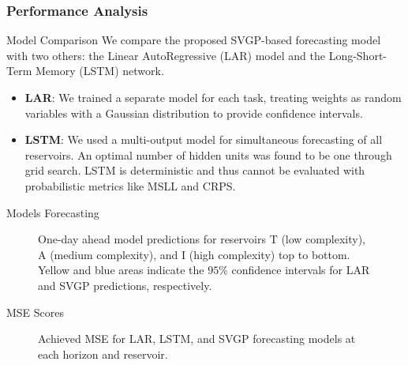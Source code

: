 \subsubsection{Performance Analysis}

\begin{frame}{Model Comparison}
	We compare the proposed SVGP-based forecasting model with two others: the Linear AutoRegressive (LAR) model and the Long-Short-Term Memory (LSTM) network.
	
	\begin{itemize}
		\item \textbf{LAR}: We trained a separate model for each task, treating weights as random variables with a Gaussian distribution to provide confidence intervals.
		\item \textbf{LSTM}: We used a multi-output model for simultaneous forecasting of all reservoirs. An optimal number of hidden units was found to be one through grid search. LSTM is deterministic and thus cannot be evaluated with probabilistic metrics like MSLL and CRPS.
	\end{itemize}
\end{frame}


\begin{frame}{Models Forecasting}
	\begin{figure}[htbp]
		\centering
		\setlength\figurewidth{\columnwidth} 
		\setlength{}
		
		\hfill
		\hfill
		
		
		\caption{One-day ahead model predictions for reservoirs T (low complexity), A (medium complexity), and I (high complexity) top to bottom. Yellow and blue areas indicate the $95\%$ confidence intervals for LAR and SVGP predictions, respectively.}
		
	\end{figure}
\end{frame}


\begin{frame}{MSE Scores}
	\begin{figure}[htbp]
		\setlength{} 
		\setlength{}
		\hspace{-1.5em}
		\hspace{-1.5em}
		\caption{Achieved MSE for LAR, LSTM, and SVGP forecasting models at each horizon and reservoir.}
		\label{fig:mse_scores} 
	\end{figure}
\end{frame}


